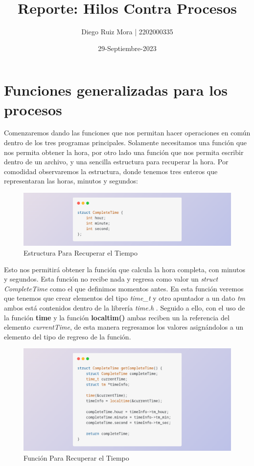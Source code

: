 \documentclass[10pt]{article}
\title{\textbf{Reporte: Hilos Contra Procesos}}
\author{Diego Ruiz Mora | 2202000335}
\date{29-Septiembre-2023}
\begin{document}
	
	\maketitle
	\section{Funciones generalizadas para los procesos}
	Comenzaremos dando las funciones que nos permitan hacer operaciones en común dentro de los tres programas principales. Solamente necesitamos una función que nos permita obtener la hora, por otro lado una función que nos permita escribir dentro de un archivo, y una sencilla estructura para recuperar la hora. 
	Por comodidad observaremos la estructura, donde tenemos tres enteros que representaran las horas, minutos y segundos: 
	\begin{figure}[h!]
		\centering
		\includegraphics[width=\linewidth]{estructura.png}
		\caption{Estructura Para Recuperar el Tiempo}
		\label{fig:estructura}
	\end{figure}
	Esto nos permitirá obtener la función que calcula la hora completa, con minutos y segundos. Esta función no recibe nada y regresa como valor un \textit{struct CompleteTime} como el que definimos momentos antes.
	En esta función veremos que tenemos que crear elementos del tipo \textit{time\_t} y otro apuntador a un dato \textit{tm} ambos está contenidos dentro de la librería \emph{time.h} . Seguido a ello, con el uso de la función \textbf{time} y la función \textbf{localtim()} ambas reciben un la referencia del elemento \textit{currentTime}, de esta manera regresamos los valores asignándolos a un elemento del tipo de regreso de la función. 
	\begin{figure}[h!]
		\centering
		\includegraphics[width=\linewidth]{tiempo.png}
		\caption{Función Para Recuperar el Tiempo}
		\label{fig:tiempo}
	\end{figure}
\end{document}

